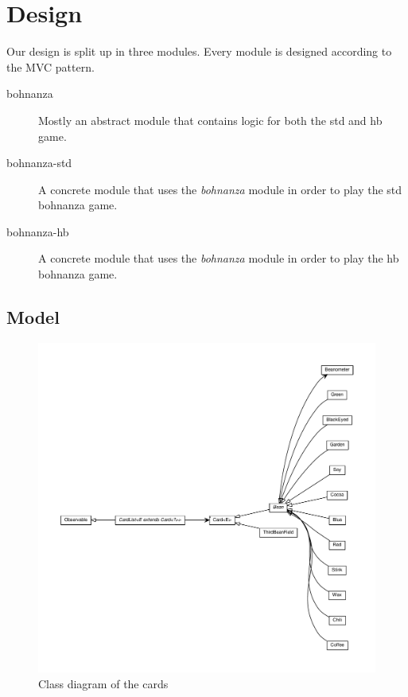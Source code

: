 \section{Design}

Our design is split up in three modules. Every module is designed according to the MVC pattern.
\begin{description}
    \item[bohnanza] {Mostly an abstract module that contains logic for both the \gls{std} and
    \gls{hb} game.}
    \item[bohnanza-std] {A concrete module that uses the \emph{bohnanza} module in order to play
    the \gls{std} bohnanza game.}
    \item[bohnanza-hb] {A concrete module that uses the \emph{bohnanza} module in order to play the
    \gls{hb} bohnanza game.}
\end{description}

\subsection{Model}

\begin{figure}[h!]
    \includegraphics[width=\textwidth]{../umlgraph/CardGraph}
    \caption{Class diagram of the cards}
    \label{fig:design:cards}
\end{figure}

